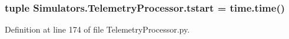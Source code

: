 \hypertarget{namespace_simulators_1_1_telemetry_processor_a6dd741085429d34d1cba94d3e166de78}{}
\subsubsection[{tstart}]{\setlength{\rightskip}{0pt plus 5cm}tuple Simulators.\+Telemetry\+Processor.\+tstart = time.\+time()}\label{namespace_simulators_1_1_telemetry_processor_a6dd741085429d34d1cba94d3e166de78}


Definition at line 174 of file Telemetry\+Processor.\+py.


